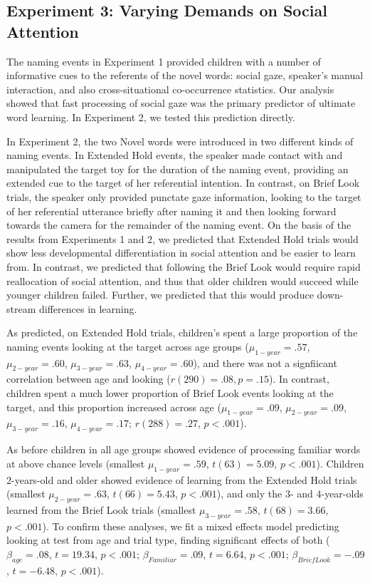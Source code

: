 \documentclass{pnastwo}
\begin{document}
\begin{article}
\section{Experiment 3: Varying Demands on Social Attention}

The naming events in Experiment 1 provided children with a number of informative cues to the referents of the novel words: social gaze, speaker's manual interaction, and also cross-situational co-occurrence statistics. Our analysis showed that fast processing of social gaze was the primary predictor of ultimate word learning. In Experiment 2, we tested this prediction directly. 

In Experiment 2, the two Novel words were introduced in two different kinds of naming events. In Extended Hold events, the speaker made contact with and manipulated the target toy for the duration of the naming event, providing an extended cue to the target of her referential intention. In contrast, on Brief Look trials, the speaker only provided punctate gaze information, looking to the target of her referential utterance briefly after naming it and then looking forward towards the camera for the remainder of the naming event. On the basis of the results from Experiments 1 and 2, we predicted that Extended Hold trials would show less developmental differentiation in social attention and be easier to learn from. In contrast, we predicted that following the Brief Look would require rapid reallocation of social attention, and thus that older children would succeed while younger children failed. Further, we predicted that this would produce down-stream differences in learning.

As predicted, on Extended Hold trials, children's spent a large proportion of the naming events looking at the target across age groups ($\mu_{1-year} = .57$, $\mu_{2-year} = .60$, $\mu_{3-year} = .63$, $\mu_{4-year} = .60$), and there was not a signfiicant correlation between age and looking ($r(290) = .08, p = .15$). In contrast, children spent a much lower proportion of Brief Look events looking at the target, and this proportion increased across age ($\mu_{1-year} = .09$, $\mu_{2-year} = .09$, $\mu_{3-year} = .16$, $\mu_{4-year} = .17$; $r(288) = .27$, $p  < .001$). 

As before children in all age groups showed evidence of processing familiar words at above chance levels (smallest $\mu_{1-year} = .59$, $t(63) = 5.09$, $p < .001$). Children 2-years-old and older showed evidence of learning from the Extended Hold trials (smallest $\mu_{2-year} = .63$, $t(66) = 5.43$, $p < .001$), and only the 3- and 4-year-olds learned from the Brief Look trials (smallest $\mu_{3-year} = .58$, $t(68) = 3.66$, $p < .001$). To confirm these analyses, we fit a mixed effects model predicting looking at test from age and trial type, finding significant effects of both ($\beta_{age} = .08$, $t = 19.34$, $p < . 001$; $\beta_{Familiar} = .09$, $t = 6.64$, $p < . 001$; $\beta_{Brief Look} = -.09$, $t = -6.48$, $p < . 001$).


\end{article}
\end{document}
